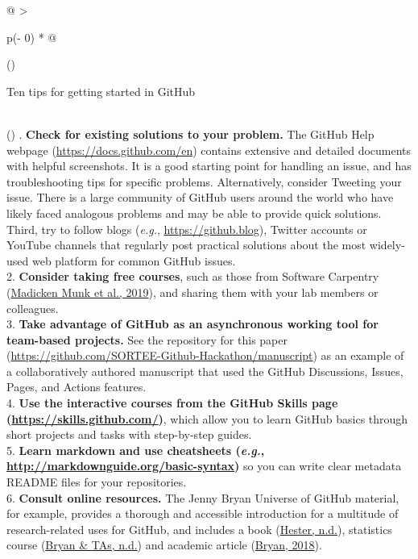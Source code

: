 \begin{tablenos:no-prefix-table-caption}

\begin{longtable}[]{@{}
  >{\raggedright\arraybackslash}p{(\columnwidth - 0\tabcolsep) * }@{}}
\toprule()
\begin{minipage}[b]{\linewidth}\raggedright
Ten tips for getting started in GitHub
\end{minipage} \\
\midrule()
. \textbf{Check for existing solutions to your problem.} The GitHub Help webpage (\url{https://docs.github.com/en}) contains extensive and detailed documents with helpful screenshots. It is a good starting point for handling an issue, and has troubleshooting tips for specific problems. Alternatively, consider Tweeting your issue. There is a large community of GitHub users around the world who have likely faced analogous problems and may be able to provide quick solutions. Third, try to follow blogs (\emph{e.g.}, \url{https://github.blog}), Twitter accounts or YouTube channels that regularly post practical solutions about the most widely-used web platform for common GitHub issues. \\
2. \textbf{Consider taking free courses}, such as those from Software Carpentry (\protect\hyperlink{ref-pjy75gHr}{Madicken Munk et al., 2019}), and sharing them with your lab members or colleagues. \\
3. \textbf{Take advantage of GitHub as an asynchronous working tool for team-based projects.} See the repository for this paper (\url{https://github.com/SORTEE-Github-Hackathon/manuscript}) as an example of a collaboratively authored manuscript that used the GitHub Discussions, Issues, Pages, and Actions features. \\
4. \textbf{Use the interactive courses from the GitHub Skills page (\url{https://skills.github.com/})}, which allow you to learn GitHub basics through short projects and tasks with step-by-step guides. \\
5. \textbf{Learn markdown and use cheatsheets (\emph{e.g.}, \url{http://markdownguide.org/basic-syntax})} so you can write clear metadata README files for your repositories. \\
6. \textbf{Consult online resources.} The Jenny Bryan Universe of GitHub material, for example, provides a thorough and accessible introduction for a multitude of research-related uses for GitHub, and includes a book (\protect\hyperlink{ref-ZvrOcg9w}{Hester, n.d.}), statistics course (\protect\hyperlink{ref-6CMMeSeD}{Bryan \& TAs, n.d.}) and academic article (\protect\hyperlink{ref-RVetqmsg}{Bryan, 2018}). \\

\end{longtable}
\end{tablenos:no-prefix-table-caption}
